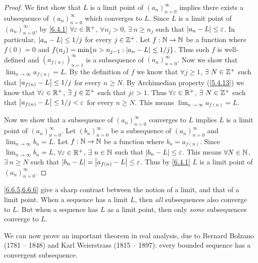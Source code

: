\begin{proof}
  We first show that \(L\) is a limit point of \((a_n)_{n = 0}^\infty\) implies there exists a subsequence of \((a_n)_{n = 0}^\infty\) which converges to \(L\).
  Since \(L\) is a limit point of \((a_n)_{n = 0}^\infty\), by \cref{6.4.1} \(\forall \varepsilon \in \mathbb{R}^+\), \(\forall n_j > 0\), \(\exists\ n \geq n_j\) such that \(\left\lvert a_n - L\right\rvert \leq \varepsilon\).
  In particular, \(\left\lvert a_n - L\right\rvert \leq 1 / j\) for every \(j \in \mathbb{Z}^+\).
  Let \(f : \mathbb{N} \to \mathbb{N}\) be a function where \(f(0) = 0\) and \(f(n_j) = \min\{n > n_{j - 1} : \left\lvert a_n - L\right\rvert \leq 1 / j\}\).
  Thus such \(f\) is well-defined and \((a_{f(n)})_{n = 1}^\infty\) is a subsequence of \((a_n)_{n = 0}^\infty\).
  Now we show that \(\lim_{n \to \infty} a_{f(n)} = L\).
  By the definition of \(f\) we know that \(\forall j \geq 1\), \(\exists\ N \in \mathbb{Z}^+\) such that \(\left\lvert a_{f(n)} - L\right\rvert \leq 1 / j\) for every \(n \geq N\).
  By Archimedian property (\cref{5.4.13}) we know that \(\forall \varepsilon \in \mathbb{R}^+\), \(\exists\ j \in \mathbb{Z}^+\) such that \(j \varepsilon > 1\).
  Thus \(\forall \varepsilon \in \mathbb{R}^+\), \(\exists\ N \in \mathbb{Z}^+\) such that \(\left\lvert a_{f(n)} - L\right\rvert \leq 1 / j < \varepsilon\) for every \(n \geq N\).
  This means \(\lim_{n \to \infty} a_{f(n)} = L\).

  Now we show that a subsequence of \((a_n)_{n = 0}^\infty\) converges to \(L\) implies \(L\) is a limit point of \((a_n)_{n = 0}^\infty\).
  Let \((b_n)_{n = 0}^\infty\) be a subsequence of \((a_n)_{n = 0}^\infty\) and \(\lim_{n \to \infty} b_n = L\).
  Let \(f : \mathbb{N} \to \mathbb{N}\) be a function where \(b_n = a_{f(n)}\).
  Since \(\lim_{n \to \infty} b_n = L\), \(\forall \varepsilon \in \mathbb{R}^+\), \(\exists\ n \in \mathbb{N}\) such that \(\left\lvert b_n - L\right\rvert \leq \varepsilon\).
  This means \(\forall N \in \mathbb{N}\), \(\exists\ n \geq N\) such that \(\left\lvert b_n - L\right\rvert = \left\lvert a_{f(n)} - L\right\rvert \leq \varepsilon\).
  Thus by \cref{6.4.1} \(L\) is a limit point of \((a_n)_{n = 0}^\infty\).
\end{proof}

\begin{rmk}\label{6.6.7}
  \cref{6.6.5,6.6.6} give a sharp contrast between the notion of a limit, and that of a limit point.
  When a sequence has a limit \(L\), then \emph{all} subsequences also converge to \(L\).
  But when a sequence has \(L\) as a limit point, then only \emph{some} subsequences converge to \(L\).
\end{rmk}

\begin{note}
  We can now prove an important theorem in real analysis, due to Bernard Bolzano (1781 -- 1848) and Karl Weierstrass (1815 -- 1897):
  every bounded sequence has a convergent subsequence.
\end{note}

